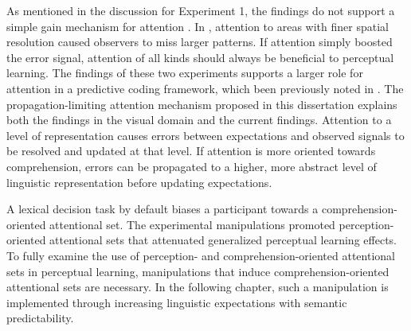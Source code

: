 As mentioned in the discussion for Experiment 1, the findings do not support a simple gain mechanism for attention \citep[contra][]{Clark2013}.  
In \citet{Yeshurun1998}, attention to areas with finer spatial resolution caused observers to miss larger patterns.  
If attention simply boosted the error signal, attention of all kinds should always be beneficial to perceptual learning.
The findings of these two experiments supports a larger role for attention in a predictive coding framework, which been previously noted in \citet{Block2013}.
The propagation-limiting attention mechanism proposed in this dissertation explains both the findings in the visual domain and the current findings.
Attention to a level of representation causes errors between expectations and observed signals to be resolved and updated at that level.
If attention is more oriented towards comprehension, errors can be propagated to a higher, more abstract level of linguistic representation before updating expectations.

A lexical decision task by default biases a participant towards a comprehension-oriented attentional set.
The experimental manipulations promoted perception-oriented attentional sets that attenuated generalized perceptual learning effects.
To fully examine the use of perception- and comprehension-oriented attentional sets in perceptual learning, manipulations that induce comprehension-oriented attentional sets are necessary.
In the following chapter, such a manipulation is implemented through increasing linguistic expectations with semantic predictability.




